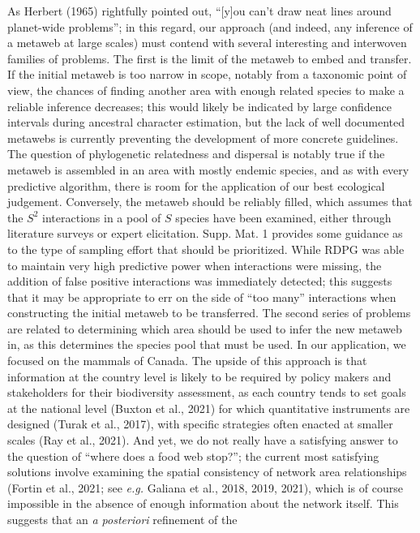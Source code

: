 \documentclass[10pt,oneside]{article}
\begin{document}
As Herbert (1965) rightfully pointed out, ``{[}y{]}ou can't draw neat
lines around planet-wide problems''; in this regard, our approach (and
indeed, any inference of a metaweb at large scales) must contend with
several interesting and interwoven families of problems. The first is
the limit of the metaweb to embed and transfer. If the initial metaweb
is too narrow in scope, notably from a taxonomic point of view, the
chances of finding another area with enough related species to make a
reliable inference decreases; this would likely be indicated by large
confidence intervals during ancestral character estimation, but the lack
of well documented metawebs is currently preventing the development of
more concrete guidelines. The question of phylogenetic relatedness and
dispersal is notably true if the metaweb is assembled in an area with
mostly endemic species, and as with every predictive algorithm, there is
room for the application of our best ecological judgement. Conversely,
the metaweb should be reliably filled, which assumes that the \(S^2\)
interactions in a pool of \(S\) species have been examined, either
through literature surveys or expert elicitation. Supp. Mat. 1 provides
some guidance as to the type of sampling effort that should be
prioritized. While RDPG was able to maintain very high predictive power
when interactions were missing, the addition of false positive
interactions was immediately detected; this suggests that it may be
appropriate to err on the side of ``too many'' interactions when
constructing the initial metaweb to be transferred. The second series of
problems are related to determining which area should be used to infer
the new metaweb in, as this determines the species pool that must be
used. In our application, we focused on the mammals of Canada. The
upside of this approach is that information at the country level is
likely to be required by policy makers and stakeholders for their
biodiversity assessment, as each country tends to set goals at the
national level (Buxton et al., 2021) for which quantitative instruments
are designed (Turak et al., 2017), with specific strategies often
enacted at smaller scales (Ray et al., 2021). And yet, we do not really
have a satisfying answer to the question of ``where does a food web
stop?''; the current most satisfying solutions involve examining the
spatial consistency of network area relationships (Fortin et al., 2021;
see \emph{e.g.} Galiana et al., 2018, 2019, 2021), which is of course
impossible in the absence of enough information about the network
itself. This suggests that an \emph{a posteriori} refinement of the
\end{document}
